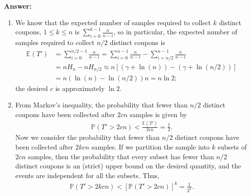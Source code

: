 \documentclass[a4paper,11pt]{article}
\begin{document}
\noindent
{\bf Answer:}
\begin{enumerate}[label=(\alph*)]
    \item
        We know that the expected number of samples required to collect $k$ distinct coupons, $1 \leq k \leq n$ is $\sum_{i = 0}^{k - 1} \frac{n}{n - i}$, so in particular, the expected number of samples required to collect $n/2$ distinct coupons is
        \begin{align*}
            \mathbb{E}(T') &= \sum_{i = 0}^{n/2 - 1} \frac{n}{n - i} = \sum_{i = 0}^{n - 1} \frac{n}{n - i} - \sum_{i = n/2}^{n - 1} \frac{n}{n - i} \\
            &= nH_n - nH_{n/2} \approx n[(\gamma + \ln(n)) - (\gamma + \ln(n/2))] \\
            &= n(\ln(n) - \ln(n/2)) n = n\ln 2;
        \end{align*}
        the desired $c$ is approximately $\ln 2$.
    \item
        From Markov's inequality, the probability that fewer than $n/2$ distinct coupons have been collected after $2cn$ samples is given by
        \begin{align*}
            \mathbb{P}(T' > 2cn) < \frac{\mathbb{E}(T')}{2cn} = \frac{1}{2}.
        \end{align*}
        Now we consider the probability that fewer than $n/2$ distinct coupons have been collected after $2kcn$ samples. If we partition the sample into $k$ subsets of $2cn$ samples, then the probability that every subset has fewer than $n/2$ distinct coupons is an (strict) upper bound on the desired quantity, and the events are independent for all the subsets. Thus,
        \begin{align*}
            \mathbb{P}(T' > 2kcn) < [\mathbb{P}(T' > 2cn)]^k = \frac{1}{2^k}.
        \end{align*}
\end{enumerate}
\end{document}
